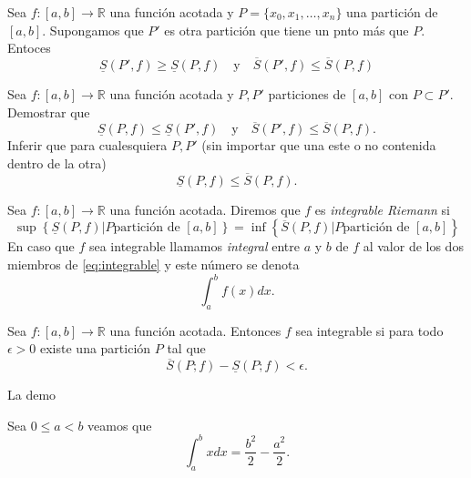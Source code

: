 \begin{lema}  Sea $f:[a,b]\to\mathbb{R}$ una función acotada y $P=\{x_0,x_1,\ldots,x_n\}$ una partición de $[a,b]$. Supongamos que $P'$ es otra partición que tiene un pnto más que $P$. Entoces
 \[
  \underline{S}(P',f)\geq \underline{S}(P,f)\quad\text{y}\quad \overline{S}(P',f)\leq \overline{S}(P,f)
 \]
\end{lema}

\begin{ejercicio} Sea $f:[a,b]\to\mathbb{R}$ una función acotada y $P,P'$ particiones de $[a,b]$ con $P\subset P'$. Demostrar que 
  \[
  \underline{S}(P,f)\leq \underline{S}(P',f)\quad\text{y}\quad \overline{S}(P',f)\leq \overline{S}(P,f).
 \]
 Inferir que para cualesquiera $P,P'$ (sin importar que una este o no contenida dentro de la otra)
   \[
\underline{S}(P,f)\leq \overline{S}(P,f).
 \]
 
\end{ejercicio}

\begin{definicion} Sea $f:[a,b]\to\mathbb{R}$ una función acotada. Diremos que $f$ es {\em integrable Riemann}  si 
\begin{equation}\label{eq:integrable}
 \sup\left\{\underline{S}(P,f)| P \text{partición de }[a,b]\right\}=\inf\left\{\overline{S}(P,f)| P \text{partición de }[a,b]\right\}
\end{equation}
En caso que $f$ sea integrable llamamos {\em integral}  entre $a$ y $b$ de $f$ al valor de los dos miembros de \eqref{eq:integrable} y este número se denota
\[
\int_a^bf(x)dx. 
\]
 
\end{definicion}
 
\begin{teorema}  Sea $f:[a,b]\to\mathbb{R}$ una función acotada. Entonces  $f$ sea integrable si para todo $\epsilon>0$ existe una partición $P$ tal que 
\begin{equation}\label{eq:Crit1Int}
 \overline{S}(P;f)-\underline{S}(P;f)<\epsilon.
\end{equation}
 
\end{teorema}

\begin{demo} La demo
 
\end{demo}


\begin{ejemplo} Sea $0\leq a<b$ veamos que 
\[
 \int_a^b x dx=\frac{b^2}{2}-\frac{a^2}{2}.
\]
\end{ejemplo}


